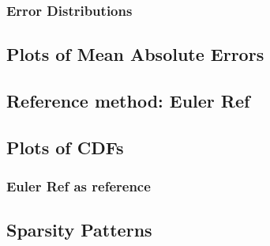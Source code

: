 \subsubsection{Error Distributions}
	
	\errDisEulerRef


\subsection{Plots of Mean Absolute Errors}
\subsection{Reference method: Euler Ref}
	
\subsection{Plots of CDFs}
\subsubsection{Euler Ref as reference}
	
\subsection{Sparsity Patterns}
	
